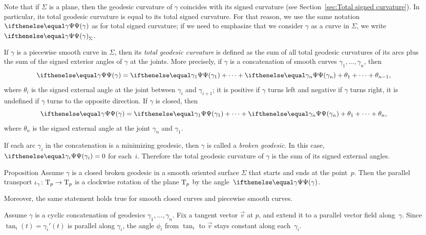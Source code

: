 Note that if $\Sigma$ is a plane, then the geodesic curvature of $\gamma$ coincides
with its signed curvature (see Section~\ref{sec:Total signed curvature}). 
In particular, its total geodesic curvature is equal to its total signed curvature.
For that reason, we use the same notation $\tgc\gamma$ as for total signed curvature; if we need to emphasize that we consider $\gamma$ as a curve in $\Sigma$, we write $\tgc\gamma_\Sigma$.

If $\gamma$ is a piecewise smooth curve in $\Sigma$, then
its \emph{total geodesic curvature} is defined as the sum of all total geodesic curvatures of its arcs plus the sum of the signed exterior angles of $\gamma$ at the joints.
More precisely, if $\gamma$ is a concatenation of smooth curves $\gamma_1,\dots,\gamma_n$, then
\[\tgc\gamma=\tgc{\gamma_1}+\dots+\tgc{\gamma_n}+\theta_1+\dots+\theta_{n-1},\]
where $\theta_i$ is the signed external angle at the joint between $\gamma_i$ and $\gamma_{i+1}$;
it is positive if $\gamma$ turns left and negative if $\gamma$ turns right, it is undefined if $\gamma$ turns to the opposite direction.
If $\gamma$ is closed, then 
\[\tgc\gamma=\tgc{\gamma_1}+\dots+\tgc{\gamma_n}+\theta_1+\dots+\theta_n,\]
where $\theta_n$ is the signed external angle at the joint $\gamma_n$ and $\gamma_1$.

If each arc $\gamma_i$ in the concatenation is a minimizing geodesic, then $\gamma$ is called a \emph{broken geodesic}.
In this case, $\tgc{\gamma_i}=0$ for each~$i$.
Therefore the total geodesic curvature of $\gamma$ is the sum of its signed external angles.

\begin{thm}{Proposition}\label{prop:pt+tgc}
Assume $\gamma$ is a closed broken geodesic in a smooth oriented surface $\Sigma$ that starts and ends at the point~$p$.
Then the parallel transport $\iota_\gamma\colon\mathrm{T}_p\to\mathrm{T}_p$ is a clockwise rotation of the plane $\mathrm{T}_p$ by the angle~$\tgc\gamma$.

Moreover, the same statement holds true for smooth closed curves and piecewise smooth curves.
\end{thm}

Assume $\gamma$ is a cyclic concatenation of geodesics $\gamma_1,\dots,\gamma_n$.
Fix a tangent vector ${\vec v}$ at $p$, and extend it to a parallel vector field along~$\gamma$.
Since $\tan_i(t)=\gamma_i'(t)$ is parallel along $\gamma_i$, the angle $\phi_i$ from $\tan_i$ to ${\vec v}$ stays constant along each~$\gamma_i$.

